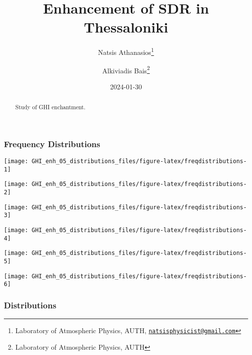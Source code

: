 \documentclass[
  10pt,
  a4paper,oneside]{article}
\title{Enhancement of SDR in Thessaloniki}
\author{Natsis Athanasios\footnote{Laboratory of Atmospheric Physics, AUTH, \href{mailto:natsisphysicist@gmail.com}{\nolinkurl{natsisphysicist@gmail.com}}} \and Alkiviadis Bais\footnote{Laboratory of Atmospheric Physics, AUTH}}
\date{2024-01-30}
\begin{document}
\maketitle
\begin{abstract}
Study of GHI enchantment.
\end{abstract}

{
\hypersetup{linkcolor=}
\setcounter{tocdepth}{4}
\tableofcontents
}
\FloatBarrier

\hypertarget{frequency-distributions}{%
\subsubsection{Frequency Distributions}\label{frequency-distributions}}

\begin{center}\texttt{[image: GHI\_enh\_05\_distributions\_files/figure-latex/freqdistributions-1]} \end{center}

\begin{center}\texttt{[image: GHI\_enh\_05\_distributions\_files/figure-latex/freqdistributions-2]} \end{center}

\begin{center}\texttt{[image: GHI\_enh\_05\_distributions\_files/figure-latex/freqdistributions-3]} \end{center}

\begin{center}\texttt{[image: GHI\_enh\_05\_distributions\_files/figure-latex/freqdistributions-4]} \end{center}

\begin{center}\texttt{[image: GHI\_enh\_05\_distributions\_files/figure-latex/freqdistributions-5]} \end{center}

\begin{center}\texttt{[image: GHI\_enh\_05\_distributions\_files/figure-latex/freqdistributions-6]} \end{center}

\FloatBarrier

\hypertarget{distributions}{%
\subsubsection{Distributions}\label{distributions}}
\end{document}
